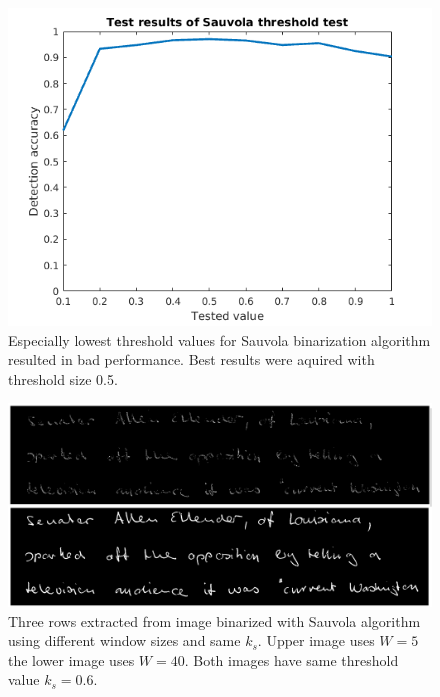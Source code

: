 \documentclass{article}
\begin{document}
    \begin{figure}[!ht]
      \centering
      \includegraphics[natwidth=560,natheight=420,scale=0.45]{sauvolathreshold_test.png}
      \caption{Especially lowest threshold values for Sauvola binarization algorithm resulted in bad performance. Best results were aquired with threshold size 0.5. \label{fig:sauvolathreshold}}
    \end{figure}

    \begin{figure}[!ht]
      \centering
      \includegraphics[natwidth=2178,natheight=1048,scale=0.18]{sauvola_5_40.png}
      \caption{Three rows extracted from image binarized with Sauvola algorithm using different window sizes and same $k_s$. Upper image uses $W = 5$  the lower image uses $W = 40$. Both images have same threshold value $k_s = 0.6$. \label{fig:sauvola540}}
    \end{figure}
\end{document}
